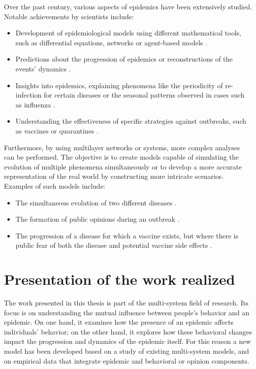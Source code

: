 Over the past century, various aspects of epidemics have been extensively studied. Notable achievements by scientists include:
\begin{itemize}
	\item Development of epidemiological models using different mathematical tools, such as differential equations, networks or agent-based models \cite{Hernandez_Vargas_2022, Keeling_2005}.
	\item Predictions about the progression of epidemics or reconstructions of the events' dynamics \cite{diekmann2000mathematical, brauer2012mathematical, Ledder_2023}.
	\item Insights into epidemics, explaining phenomena like the periodicity of re-infection for certain diseases or the seasonal patterns observed in cases such as influenza \cite{Bjoernstad2016}.
	\item Understanding the effectiveness of specific strategies against outbreaks, such as vaccines or quarantines \cite{Wang_2015_review}.
\end{itemize}
Furthermore, by using multilayer networks or systems, more complex analyses can be performed. The objective is to create models capable of simulating the evolution of multiple phenomena simultaneously or to develop a more accurate representation of the real world by constructing more intricate scenarios. Examples of such models include:
\begin{itemize}
	\item The simultaneous evolution of two different diseases \cite{DeDomenico2016}.
	\item The formation of public opinions during an outbreak \cite{teslya2022}.
	\item The progression of a disease for which a vaccine exists, but where there is public fear of both the disease and potential vaccine side effects \cite{Epstein_2021}.
\end{itemize}

\section{Presentation of the work realized}
The work presented in this thesis is part of the multi-system field of research. Its focus is on understanding the mutual influence between people's behavior and an epidemic. On one hand, it examines how the presence of an epidemic affects individuals' behavior; on the other hand, it explores how these behavioral changes impact the progression and dynamics of the epidemic itself. 
For this reason a new model has been developed based on a study of existing multi-system models, and on empirical data that integrate epidemic and behavioral or opinion components.

